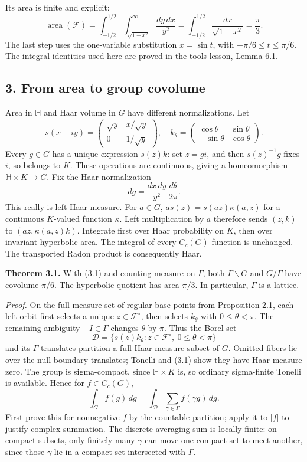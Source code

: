\documentclass[
  english,
  11pt,
  a4paper,
]{article}
\begin{document}
Its area is finite and explicit: \[\operatorname{area}(\mathcal F)
=\int_{-1/2}^{1/2}\int_{\sqrt{1-x^2}}^\infty\frac{dy\,dx}{y^2}
=\int_{-1/2}^{1/2}\frac{dx}{\sqrt{1-x^2}}
=\frac\pi3.
\tag{2.2}\] The last step uses the one-variable substitution
\(x=\sin t\), with \(-\pi/6\le t\le\pi/6\). The integral identities used
here are proved in the tools lesson, Lemma 6.1.

\subsection{3. From area to group
covolume}\label{finite-covolume-and-arithmetic-quotients--3-from-area-to-group-covolume}

Area in \(\mathbb H\) and Haar volume in \(G\) have different
normalizations. Let
\[s(x+iy)=\begin{pmatrix}\sqrt y&x/\sqrt y\\0&1/\sqrt y\end{pmatrix},
\quad k_\theta=\begin{pmatrix}\cos\theta&\sin\theta\\ -\sin\theta&\cos\theta\end{pmatrix}.\]
Every \(g\in G\) has a unique expression \(s(z)k\): set \(z=gi\), and
then \(s(z)^{-1}g\) fixes \(i\), so belongs to \(K\). These operations
are continuous, giving a homeomorphism \(\mathbb H\times K\to G\). Fix
the Haar normalization \[dg=\frac{dx\,dy}{y^2}\,\frac{d\theta}{2\pi}.
\tag{3.1}\] This really is left Haar measure. For \(a\in G\),
\(a s(z)=s(az)\kappa(a,z)\) for a continuous \(K\)-valued function
\(\kappa\). Left multiplication by \(a\) therefore sends \((z,k)\) to
\((az,\kappa(a,z)k)\). Integrate first over Haar probability on \(K\),
then over invariant hyperbolic area. The integral of every \(C_c(G)\)
function is unchanged. The transported Radon product is consequently
Haar.

\textbf{Theorem 3.1.} With (3.1) and counting measure on \(\Gamma\),
both \(\Gamma\backslash G\) and \(G/\Gamma\) have covolume \(\pi/6\).
The hyperbolic quotient has area \(\pi/3\). In particular, \(\Gamma\) is
a lattice.

\emph{Proof.} On the full-measure set of regular base points from
Proposition 2.1, each left orbit first selects a unique
\(z\in\mathcal F^\circ\), then selects \(k_\theta\) with
\(0\le\theta<\pi\). The remaining ambiguity \(-I\in\Gamma\) changes
\(\theta\) by \(\pi\). Thus the Borel set
\[\mathcal D=\{s(z)k_\theta:z\in\mathcal F^\circ,\ 0\le\theta<\pi\}\]
and its \(\Gamma\)-translates partition a full-Haar-measure subset of
\(G\). Omitted fibers lie over the null boundary translates; Tonelli and
(3.1) show they have Haar measure zero. The group is sigma-compact,
since \(\mathbb H\times K\) is, so ordinary sigma-finite Tonelli is
available. Hence for \(f\in C_c(G)\), \[\int_G f(g)\,dg
=\int_{\mathcal D}\sum_{\gamma\in\Gamma}f(\gamma g)\,dg.
\tag{3.2}\] First prove this for nonnegative \(f\) by the countable
partition; apply it to \(|f|\) to justify complex summation. The
discrete averaging sum is locally finite: on compact subsets, only
finitely many \(\gamma\) can move one compact set to meet another, since
those \(\gamma\) lie in a compact set intersected with \(\Gamma\).
\end{document}
